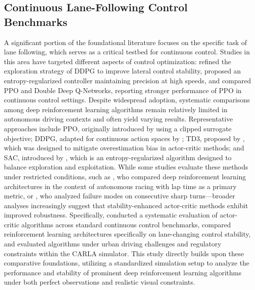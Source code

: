 \documentclass[sn-mathphys,Numbered]{sn-jnl}
\begin{document}
\subsection{Continuous Lane-Following Control Benchmarks}
A significant portion of the foundational literature focuses on the specific task of lane following, which serves as a critical testbed for continuous control. Studies in this area have targeted different aspects of control optimization: \citet{hua2022exploration} refined the exploration strategy of DDPG to improve lateral control stability, \citet{liu2024highspeed} proposed an entropy-regularized controller maintaining precision at high speeds, and \citet{sabbir2025comparative} compared PPO and Double Deep Q-Networks, reporting stronger performance of PPO in continuous control settings. Despite widespread adoption, systematic comparisons among deep reinforcement learning algorithms remain relatively limited in autonomous driving contexts and often yield varying results. Representative approaches include PPO, originally introduced by \citet{schulman2017proximal} using a clipped surrogate objective; DDPG, adapted for continuous action spaces by \citet{lillicrap2015continuous}; TD3, proposed by \citet{fujimoto2018addressing}, which was designed to mitigate overestimation bias in actor-critic methods; and SAC, introduced by \citet{haarnoja2019sac}, which is an entropy-regularized algorithm designed to balance exploration and exploitation. While some studies evaluate these methods under restricted conditions, such as \citet{evans2023comparing}, who compared deep reinforcement learning architectures in the context of autonomous racing with lap time as a primary metric, or \citet{li2025sharpturns}, who analyzed failure modes on consecutive sharp turns—broader analyses increasingly suggest that stability-enhanced actor-critic methods exhibit improved robustness. Specifically, \citet{liu2024evaluation} conducted a systematic evaluation of actor-critic algorithms across standard continuous control benchmarks, \citet{yao2024performance} compared reinforcement learning architectures specifically on lane-changing control stability, and \citet{park2025comparative} evaluated algorithms under urban driving challenges and regulatory constraints within the CARLA simulator. This study directly builds upon these comparative foundations, utilizing a standardized simulation setup to analyze the performance and stability of prominent deep reinforcement learning algorithms under both perfect observations and realistic visual constraints.
\end{document}
